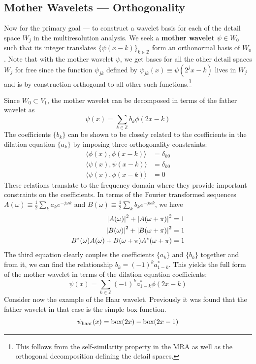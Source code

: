 \documentclass[twocolumn]{gwclass}
\newcommand{\Z}{\mathbb{Z}}
\begin{document}
\subsection{Mother Wavelets --- Orthogonality}
Now for the primary goal --- to construct a wavelet basis for each of the detail space $W_j$ in the multiresolution analysis. We seek a \textbf{mother wavelet} $\psi\in W_0$ such that its integer translates $\{\psi(x-k)\}_{k\in\Z}$ form an orthonormal basis of $W_0$. Note that with the mother wavelet $\psi$, we get bases for all the other detail spaces $W_j$ for free since the function $\psi_{jk}$ defined by $\psi_{jk}(x)\equiv \psi(2^jx-k)$ lives in $W_j$ and is by construction orthogonal to all other such functions.\footnote{This follows from the self-similarity property in the MRA as well as the orthogonal decomposition defining the detail spaces.}

Since $W_0\subset V_1$, the mother wavelet can be decomposed in terms of the father wavelet as
$$ \psi(x) = \sum_{k\in\Z} b_k \phi(2x -k) $$
The coefficients $\{b_k\}$ can be shown to be closely related to the coefficients in the dilation equation $\{a_k\}$ by imposing three orthogonality constraints:
\begin{align*}
	\langle\phi(x), \phi(x-k)\rangle &=\delta_{k0} \\
	\langle\psi(x), \psi(x-k)\rangle &= \delta_{k0} \\
	\langle\psi(x), \phi(x-k)\rangle &= 0
\end{align*}
These relations translate to the frequency domain where they provide important constraints on the coefficients. In terms of the Fourier transformed sequences $A(\omega)\equiv \frac{1}{2}\sum_k a_k e^{-j\omega k}$ and $B(\omega)\equiv \frac{1}{2}\sum_k b_k e^{-j\omega k}$, we have
\begin{align*}
	\abs{A(\omega)}^2 + \abs{A(\omega+\pi)}^2 &=1 \\
	\abs{B(\omega)}^2 + \abs{B(\omega+\pi)}^2 &=1 \\
	B^*(\omega)A(\omega) + B(\omega+\pi)A^*(\omega+\pi) &=1
\end{align*}
The third equation clearly couples the coefficients $\{a_k\}$ and $\{b_k\}$ together and from it, we can find the relationship $ b_k = (-1)^ka^*_{1-k} $. This yields the full form of the mother wavelet in terms of the dilation equation coefficients:
$$ \psi(x) = \sum_{k\in\Z} (-1)^ka_{1-k}^*\phi(2x - k) $$
Consider now the example of the Haar wavelet. Previously it was found that the father wavelet in that case is the simple box function. 
$$ \psi_{\text{\normalfont{haar}}}(x) = \text{\normalfont{box}}(2x) - \text{\normalfont{box}}(2x-1)$$
\end{document}
